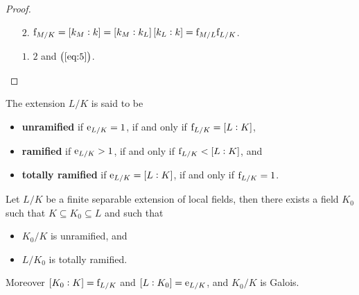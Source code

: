 \begin{proof}
\hfill
\begin{itemize}
\item[$ 2 $.] $ \f_{M / K} = \sbr{k_M : k} = \sbr{k_M : k_L}\sbr{k_L : k} = \f_{M / L}\f_{L / K} $.
\item[$ 1 $.] $ 2 $ and $ \br{\ref{eq:5}} $.
\end{itemize}
\end{proof}

\begin{definition}
The extension $ L / K $ is said to be
\begin{itemize}
\item \textbf{unramified} if $ \mathrm{e}_{L / K} = 1 $, if and only if $ \f_{L / K} = \sbr{L : K} $,
\item \textbf{ramified} if $ \mathrm{e}_{L / K} > 1 $, if and only if $ \f_{L / K} < \sbr{L : K} $, and
\item \textbf{totally ramified} if $ \e_{L / K} = \sbr{L : K} $, if and only if $ \mathrm{f}_{L / K} = 1 $.
\end{itemize}
\end{definition}

\begin{theorem}
\label{thm:14.3}
Let $ L / K $ be a finite separable extension of local fields, then there exists a field $ K_0 $ such that $ K \subseteq K_0 \subseteq L $ and such that
\begin{itemize}
\item $ K_0 / K $ is unramified, and
\item $ L / K_0 $ is totally ramified.
\end{itemize}
Moreover $ \sbr{K_0 : K} = \f_{L / K} $ and $ \sbr{L : K_0} = \e_{L / K} $, and $ K_0 / K $ is Galois.
\end{theorem}

